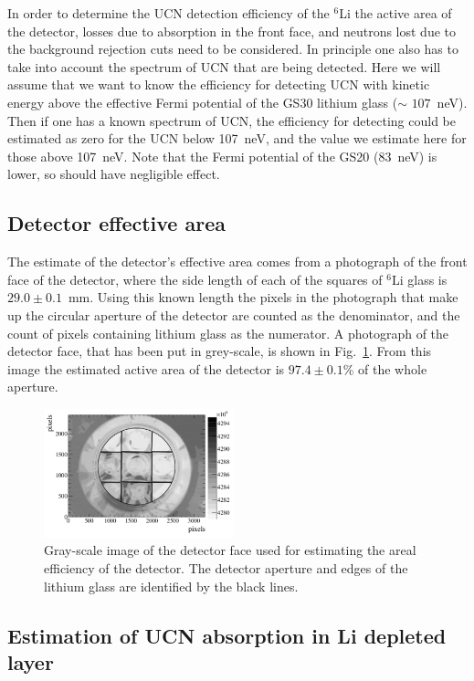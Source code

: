 \documentclass[letter,twocolumn,preprint,3p]{elsarticle}
\begin{document}
In order to determine the UCN detection efficiency of the $^{6}$Li the
active area of the detector, losses due to absorption in the front
face, and neutrons lost due to the background rejection cuts need to
be considered.  In principle one also has to take into account the
spectrum of UCN that are being detected.  Here we will assume that we
want to know the efficiency for detecting UCN with kinetic energy
above the effective Fermi potential of the GS30 lithium glass ($\sim$
$107$~neV).  Then if one has a known spectrum of UCN, the efficiency
for detecting could be estimated as zero for the UCN below 107~neV,
and the value we estimate here for those above 107~neV.  Note that the
Fermi potential of the GS20 (83~neV) is lower, so should have
negligible effect.


\subsection{ Detector effective area }

The estimate of the detector's effective area comes from a photograph
of the front face of the detector, where the side length of each of
the squares of $^6$Li glass is $29.0\pm0.1$~mm.  Using this known
length the pixels in the photograph that make up the circular aperture
of the detector are counted as the denominator, and the count of
pixels containing lithium glass as the numerator.  A photograph of the
detector face, that has been put in grey-scale, is shown in
Fig.~\ref{fig:detface}.  From this image the estimated active area of
the detector is $97.4\pm0.1$\% of the whole aperture.

\begin{figure}[!htpb]
\centering \includegraphics[width = 0.49\textwidth]{figures/detface.pdf}
\caption{Gray-scale image of the detector face used for estimating the
  areal efficiency of the detector.  The detector aperture and edges
  of the lithium glass are identified by the black lines.}
\label{fig:detface}
\end{figure}

\subsection{ Estimation of UCN absorption in Li depleted layer }
\end{document}
